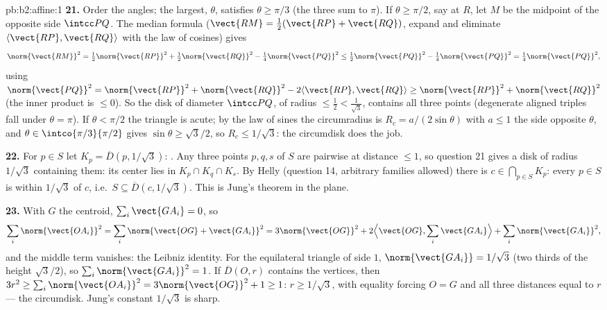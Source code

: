 \begin{solution}{pb:b2:affine:1}
\textbf{21.} Order the angles; the largest, $\theta$,
satisfies $\theta \geq \pi/3$ (the three sum to $\pi$). If
$\theta \geq \pi/2$, say at $R$, let $M$ be the midpoint of
the opposite side $\intcc PQ$. The median formula ($\vect{RM}
= \tfrac12(\vect{RP} + \vect{RQ})$, expand and eliminate
$\langle\vect{RP}, \vect{RQ}\rangle$ with the law of
cosines) gives
\[
\norm{\vect{RM}}^2 = \tfrac12\norm{\vect{RP}}^2 +
\tfrac12\norm{\vect{RQ}}^2 - \tfrac14\norm{\vect{PQ}}^2 \leq
\tfrac12\norm{\vect{PQ}}^2 - \tfrac14\norm{\vect{PQ}}^2 =
\tfrac14\norm{\vect{PQ}}^2,
\]
using $\norm{\vect{PQ}}^2 = \norm{\vect{RP}}^2 +
\norm{\vect{RQ}}^2 - 2\langle\vect{RP}, \vect{RQ}\rangle \geq
\norm{\vect{RP}}^2 + \norm{\vect{RQ}}^2$ (the inner product
is $\leq 0$). So the disk of diameter $\intcc PQ$, of radius
$\leq \tfrac12 < \tfrac1{\sqrt3}$, contains all three points
(degenerate aligned triples fall under $\theta = \pi$). If
$\theta < \pi/2$ the triangle is acute; by the law of sines
the circumradius is $R_c = a/(2\sin\theta)$ with $a \leq 1$
the side opposite $\theta$, and $\theta \in
\intco{\pi/3}{\pi/2}$ gives $\sin\theta \geq \sqrt3/2$, so
$R_c \leq 1/\sqrt3$: the circumdisk does the job.

\textbf{22.} For $p \in S$ let $K_p = \overline D(p,
1/\sqrt3)$:  . Any three points $p, q, s$ of $S$
are pairwise at distance $\leq 1$, so question 21 gives a
disk of radius $1/\sqrt3$ containing them: its center lies in
$K_p \cap K_q \cap K_s$. By  Helly (question 14,
arbitrary families allowed) there is $c \in \bigcap_{p\in
S}K_p$: every $p \in S$ is within $1/\sqrt3$ of $c$, i.e.\ $S
\subseteq \overline D(c, 1/\sqrt3)$. This is Jung's theorem
in the plane.

\textbf{23.} With $G$ the centroid, $\sum_i\vect{GA_i} = 0$,
so
\[
\sum_i\norm{\vect{OA_i}}^2 = \sum_i\norm{\vect{OG} +
\vect{GA_i}}^2 = 3\norm{\vect{OG}}^2 + 2\Bigl\langle
\vect{OG}, \sum_i\vect{GA_i}\Bigr\rangle +
\sum_i\norm{\vect{GA_i}}^2,
\]
and the middle term vanishes: the Leibniz identity. For the
equilateral triangle of side $1$, $\norm{\vect{GA_i}} =
1/\sqrt3$ (two thirds of the height $\sqrt3/2$), so
$\sum_i\norm{\vect{GA_i}}^2 = 1$. If $\overline D(O, r)$
contains the vertices, then $3r^2 \geq
\sum_i\norm{\vect{OA_i}}^2 = 3\norm{\vect{OG}}^2 + 1 \geq 1$:
$r \geq 1/\sqrt3$, with equality forcing $O = G$ and all
three distances equal to $r$ --- the circumdisk. Jung's
constant $1/\sqrt3$ is sharp.


\end{solution}
